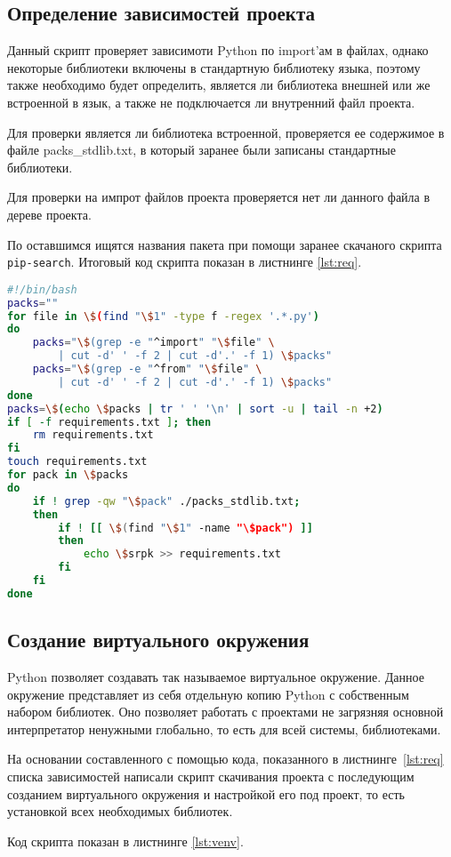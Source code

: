 \subsection{Определение зависимостей проекта}
Данный скрипт проверяет зависимоти Python по import’ам в файлах,
однако некоторые библиотеки включены в стандартную библиотеку языка, поэтому
также необходимо будет определить, является ли библиотека внешней или
же встроенной в язык, а также не подключается ли внутренний файл проекта.\par
Для проверки является ли библиотека встроенной,
проверяется ее содержимое в файле packs\_stdlib.txt, в который
заранее были записаны стандартные библиотеки.\par
Для проверки на импрот файлов
проекта проверяется нет ли данного файла в дереве проекта.\par
По оставшимся ищятся названия пакета при помощи заранее скачаного скрипта
\texttt{pip-search}.
Итоговый код скрипта показан в листнинге \ref{lst:req}.

\begin{lstlisting}[language=Bash
	, caption=\leftline{Определение зависимостей проекта}
	, label=lst:req]
#!/bin/bash
packs=""
for file in \$(find "\$1" -type f -regex '.*.py')
do
	packs="\$(grep -e "^import" "\$file" \
		| cut -d' ' -f 2 | cut -d'.' -f 1) \$packs"
	packs="\$(grep -e "^from" "\$file" \
		| cut -d' ' -f 2 | cut -d'.' -f 1) \$packs"
done
packs=\$(echo \$packs | tr ' ' '\n' | sort -u | tail -n +2)
if [ -f requirements.txt ]; then
	rm requirements.txt
fi
touch requirements.txt
for pack in \$packs
do
	if ! grep -qw "\$pack" ./packs_stdlib.txt;
	then
		if ! [[ \$(find "\$1" -name "\$pack") ]]
		then
			echo \$srpk >> requirements.txt
		fi
	fi
done
\end{lstlisting}

\subsection{Создание виртуального окружения}
Python позволяет создавать так называемое виртуальное окружение.
Данное окружение представляет из себя отдельную копию Python с
собственным набором библиотек. Оно позволяет работать с проектами не
загрязняя основной интерпретатор ненужными глобально, то есть для всей
системы, библиотеками.\par
На основании составленного с помощью кода, показанного
в листнинге~\ref{lst:req} списка зависимостей
написали скрипт скачивания проекта с
последующим созданием виртуального окружения и настройкой его под
проект, то есть установкой всех необходимых библиотек.\par
Код скрипта показан в листнинге \ref{lst:venv}.

